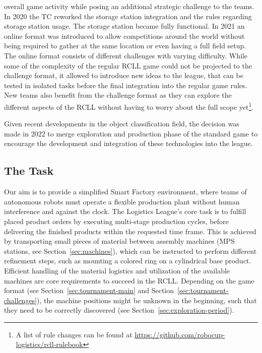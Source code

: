\documentclass[12pt,twoside]{article}
\newcommand{\refsec}[1]{Section~\ref{#1}}
\begin{document}
 overall game activity while posing an additional strategic challenge to the
 teams.
 In 2020 the \ac{TC} reworked the storage station integration and the rules
 regarding storage station usage. The storage station became fully functional.
 In 2021 an online format was introduced to allow competitions around the
 world without being required to gather at the same location or even having
 a full field setup.
 The online format consists of different challenges with varying difficulty.
 While some of the complexity of the regular \ac{RCLL} game could not be
 projected to the challenge format,
 it allowed to introduce new ideas to the league,
 that can be tested in isolated tasks before the final integration into
 the regular game rules.
 New teams also benefit from the challenge format as they can explore the
 different aspects of the \ac{RCLL} without having to worry about the full scope
 yet\footnote{A list of rule changes can be found at
 \mbox{\url{https://github.com/robocup-logistics/rcll-rulebook}}}.

 Given recent developments in the object classification field, the
 decision was made in 2022 to merge exploration and production phase of the
 standard game to encourage the development and integration of these
 technologies into the league.

\subsection{The Task}
\label{sec:task}
 Our aim is to provide a simplified Smart Factory environment, where
 teams of autonomous robots must operate a flexible production plant without
 human interference and against the clock.
 The Logistics League's core task is to fulfill placed product orders by
 executing multi-stage production cycles, before delivering the finished
 products within the requested time frame.
 This is achieved by transporting small pieces of material between assembly
 machines (\ac{MPS} stations, see \refsec{sec:machines}),
 which can be instructed to perform different refinement steps,
 such as mounting a colored ring on a cylindrical base product.
 Efficient handling of the material logistics and utilization of the available
 machines are core requirements to succeed in the \ac{RCLL}.
Depending on the game format
(see \refsec{sec:tournament-main} and \refsec{sec:tournament-challenges}),
the machine positions might be unknown in the beginning, such that they need
to be correctly discovered (see \refsec{sec:exploration-period}).
\end{document}
